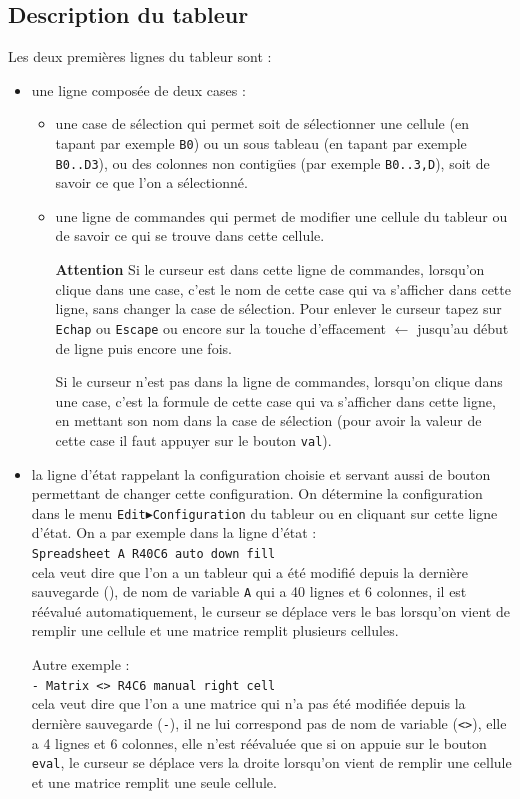 \documentclass[a4paper,11pt]{article}
\begin{document}
\subsection{Description du tableur}
Les deux premi\`eres lignes du tableur sont  : 
\begin{itemize}
\item une ligne compos\'ee 
de deux cases :
\begin{itemize}
\item une case de s\'election qui permet soit de s\'electionner une cellule 
(en tapant par exemple {\tt B0}) ou un sous tableau (en tapant par exemple 
{\tt B0..D3}), ou des colonnes non contig\"ues (par exemple 
{\tt B0..3,D}), soit de savoir ce que l'on a s\'electionn\'e. 
\item une ligne de commandes qui permet de modifier une cellule du tableur ou 
de savoir ce qui se trouve dans cette cellule.

{\bf Attention}
Si le curseur
est dans cette ligne de commandes, lorsqu'on clique dans une case, c'est le 
nom de cette case qui va s'afficher dans cette ligne, sans changer la case de 
s\'election. Pour enlever le curseur tapez sur {\tt Echap} ou {\tt Escape} ou
encore sur la touche d'effacement $\longleftarrow$ jusqu'au d\'ebut
de ligne puis encore une fois.

Si le curseur n'est pas dans la ligne de commandes, lorsqu'on clique dans une 
case, c'est la formule de cette case qui va s'afficher dans cette ligne, en
mettant son nom dans la case de s\'election (pour avoir la valeur de cette case
il faut appuyer sur le bouton {\tt val}). 
\end{itemize}
\item la ligne d'\'etat rappelant la configuration choisie et servant aussi de 
bouton permettant de changer cette configuration.
 On d\'etermine la configuration dans le menu 
{\tt Edit$\blacktriangleright$Configuration} du tableur ou en cliquant sur 
cette ligne d'\'etat.
On a par exemple dans la ligne d'\'etat :\\
{\tt * Spreadsheet A R40C6 auto down fill} \\
cela veut dire que l'on a un tableur qui a \'et\'e modifi\'e depuis la 
derni\`ere sauvegarde ({\tt *}), de nom de variable {\tt A} qui a 40 lignes
et 6 colonnes, il est r\'e\'evalu\'e automatiquement, le curseur se d\'eplace 
vers le bas lorsqu'on vient de remplir une cellule et une matrice remplit 
plusieurs cellules.

Autre exemple :\\
{\tt - Matrix <> R4C6 manual right cell}\\
cela veut dire que l'on a une matrice qui n'a pas \'et\'e modifi\'ee depuis la 
derni\`ere sauvegarde ({\tt -}), il ne lui correspond pas de nom de variable
({\tt<>}), elle a 4 lignes et 6 colonnes, elle n'est r\'e\'evalu\'ee que si on 
appuie sur le bouton {\tt eval}, le curseur se d\'eplace vers la droite 
lorsqu'on vient de remplir une cellule et une matrice remplit une seule 
cellule.
\end{itemize}
\end{document}
